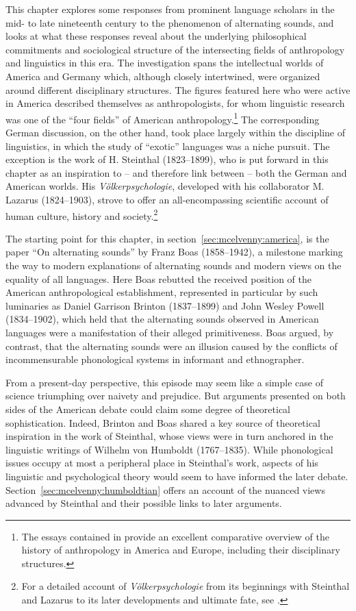 \documentclass[output=paper]{langscibook}
\begin{document}
This chapter explores some responses from prominent language scholars in the mid- to late nineteenth century to the phenomenon of alternating sounds, and looks at what these responses reveal about the underlying philosophical commitments and sociological structure of the intersecting fields of anthropology and linguistics in this era. The investigation spans the intellectual worlds of America and Germany which, although closely intertwined, were organized around different disciplinary structures. The figures featured here who were active in America described themselves as anthropologists, for whom linguistic research was one of the ``four fields'' of American anthropology.\footnote{The essays contained in \citet{Kuklick2008} provide an excellent comparative overview of the history of anthropology in America and Europe, including their disciplinary structures.} The corresponding German discussion, on the other hand, took place largely within the discipline of linguistics, in which the study of ``exotic'' languages was a niche pursuit. The exception is the work of H. Steinthal (1823–1899), who is put forward in this chapter as an inspiration to – and therefore link between – both the German and American worlds. His \emph{Völkerpsychologie}, developed with his collaborator M. Lazarus (1824–1903), strove to offer an all-encompassing scientific account of human culture, history and society.\footnote{For a detailed account of \emph{Völkerpsychologie} from its beginnings with Steinthal and Lazarus to its later developments and ultimate fate, see \citet{Klautke2013}.}

The starting point for this chapter, in section~\ref{sec:mcelvenny:america}, is the \citeyear{Boas1889} paper ``On alternating sounds'' by Franz Boas (1858–1942), a milestone marking the way to modern explanations of alternating sounds and modern views on the equality of all languages. Here Boas rebutted the received position of the American anthropological establishment, represented in particular by such luminaries as Daniel Garrison Brinton (1837–1899) and John Wesley Powell (1834–1902), which held that the alternating sounds observed in American languages were a manifestation of their alleged primitiveness. Boas argued, by contrast, that the alternating sounds were an illusion caused by the conflicts of incommensurable phonological systems in informant and ethnographer.

From a present-day perspective, this episode may seem like a simple case of science triumphing over naivety and prejudice. But arguments presented on both sides of the American debate could claim some degree of theoretical sophistication. Indeed, Brinton and Boas shared a key source of theoretical inspiration in the work of Steinthal, whose views were in turn anchored in the linguistic writings of Wilhelm von Humboldt (1767–1835). While phonological issues occupy at most a peripheral place in Steinthal's work, aspects of his linguistic and psychological theory would seem to have informed the later debate. Section~\ref{sec:mcelvenny:humboldtian} offers an account of the nuanced views advanced by Steinthal and their possible links to later arguments.
\end{document}
